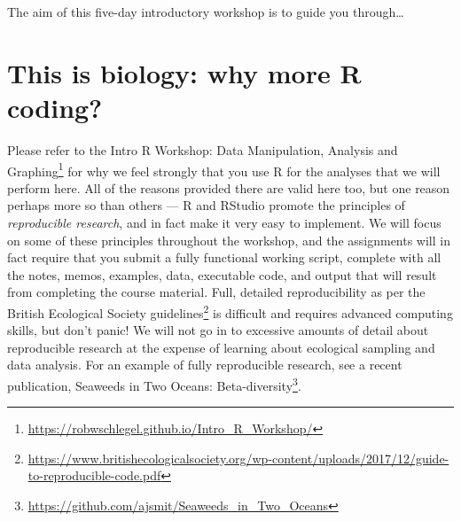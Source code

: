 \documentclass[english,10pt,a4paper,oneside]{book}
\renewcommand{\href}[2]{#2\footnote{\url{#1}}}
\let\rmarkdownfootnote\footnote%
\def\footnote{\protect\rmarkdownfootnote}
\theoremstyle{definition}
\theoremstyle{definition}
\theoremstyle{definition}
\theoremstyle{remark}
\begin{document}
The aim of this five-day introductory workshop is to guide you
through\ldots{}

\section*{This is biology: why more R
coding?}\label{this-is-biology-why-more-r-coding}

Please refer to the
\href{https://robwschlegel.github.io/Intro_R_Workshop/}{Intro R
Workshop: Data Manipulation, Analysis and Graphing} for why we feel
strongly that you use R \citep{R2017} for the analyses that we will
perform here. All of the reasons provided there are valid here too, but
one reason perhaps more so than others --- R and RStudio promote the
principles of \emph{reproducible research}, and in fact make it very
easy to implement. We will focus on some of these principles throughout
the workshop, and the assignments will in fact require that you submit a
fully functional working script, complete with all the notes, memos,
examples, data, executable code, and output that will result from
completing the course material. Full, detailed reproducibility as per
the British Ecological Society
\href{https://www.britishecologicalsociety.org/wp-content/uploads/2017/12/guide-to-reproducible-code.pdf}{guidelines}
is difficult and requires advanced computing skills, but don't panic! We
will not go in to excessive amounts of detail about reproducible
research at the expense of learning about ecological sampling and data
analysis. For an example of fully reproducible research, see a recent
publication,
\href{https://github.com/ajsmit/Seaweeds_in_Two_Oceans}{Seaweeds in Two
Oceans: Beta-diversity}.
\end{document}
